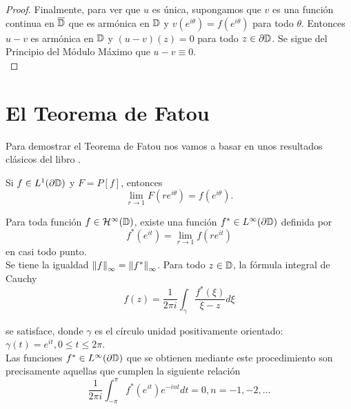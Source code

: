 \begin{proof}
    Finalmente, para ver que $u$ es única, supongamos que $v$ es una función continua en $\overline{\mathbb{D}}$ que es armónica en $\mathbb{D}$ y $v(e^{i \theta}) = f(e^{i \theta})$ para todo $\theta$. Entonces $u - v$ es armónica en $\mathbb{D}$ y $(u - v)(z) = 0$ para todo $z \in \partial \mathbb{D}$. Se sigue del Principio del Módulo Máximo que $u - v \equiv 0$. \\
\end{proof}

\section{El Teorema de Fatou}

Para demostrar el Teorema de Fatou nos vamos a basar en unos resultados clásicos del libro \citet[chap. 11]{rudin}. \\

\begin{theorem} %
    \label{th:fatouaux1}
    Si $f \in L^1(\partial \mathbb{D})$ y $F = P[f]$, entonces
    \begin{equation*}
        \lim_{r \to 1} F(re^{i \theta}) = f(e^{i \theta}).
    \end{equation*}
\end{theorem}
\medskip

\begin{theorem}
    Para toda función $f \in \mathcal{H}^{\infty}(\mathbb{D})$, existe una función $f^* \in L^{\infty} (\partial \mathbb{D})$ definida por
    \begin{equation}
        \label{eq:fatou1}
        f^*(e^{it}) = \lim_{r \to 1} f(re^{it})
    \end{equation}
    en casi todo punto. \\

    Se tiene la igualdad $\left\lVert f\right\rVert_{\infty} = \left\lVert f^*\right\rVert_{\infty}$. Para todo $z \in \mathbb{D}$, la fórmula integral de Cauchy
    \begin{equation}
        \label{eq:fatou2}
        f(z) = \dfrac{1}{2 \pi i} \int_{\gamma} \dfrac{f^*(\xi)}{\xi - z} d\xi
    \end{equation}

    se satisface, donde $\gamma$ es el círculo unidad positivamente orientado: $\gamma(t) = e^{it}, 0 \leq t \leq 2 \pi$. \\

    Las funciones $f^* \in L^{\infty}(\partial \mathbb{D})$ que se obtienen mediante este procedimiento son precisamente aquellas que cumplen la siguiente relación
    \begin{equation}
        \label{eq:fatou3}
        \dfrac{1}{2 \pi i} \int_{-\pi}^{\pi} f^*(e^{it})e^{-int} dt = 0, n = -1,-2, \dots
    \end{equation}
\end{theorem}

